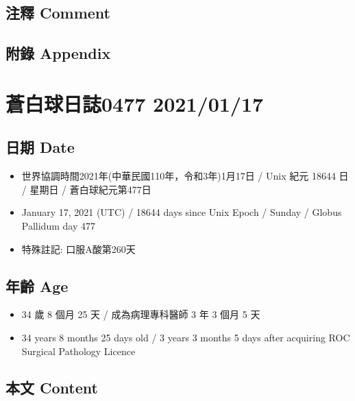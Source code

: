 \documentclass[
]{article}
\providecommand{\tightlist}{%
  \setlength{\itemsep}{0pt}\setlength{\parskip}{0pt}}
\begin{document}
\hypertarget{ux6ce8ux91cb-comment-15}{%
\subsection{注釋 Comment}\label{ux6ce8ux91cb-comment-15}}

\hypertarget{ux9644ux9304-appendix-15}{%
\subsection{附錄 Appendix}\label{ux9644ux9304-appendix-15}}

\hypertarget{ux84bcux767dux7403ux65e5ux8a8c0477-20210117}{%
\section{蒼白球日誌0477
2021/01/17}\label{ux84bcux767dux7403ux65e5ux8a8c0477-20210117}}

\hypertarget{ux65e5ux671f-date-16}{%
\subsection{日期 Date}\label{ux65e5ux671f-date-16}}

\begin{itemize}
\tightlist
\item
  世界協調時間2021年(中華民國110年，令和3年)1月17日 / Unix 紀元 18644 日
  / 星期日 / 蒼白球紀元第477日
\item
  January 17, 2021 (UTC) / 18644 days since Unix Epoch / Sunday / Globus
  Pallidum day 477
\item
  特殊註記: 口服A酸第260天
\end{itemize}

\hypertarget{ux5e74ux9f61-age-16}{%
\subsection{年齡 Age}\label{ux5e74ux9f61-age-16}}

\begin{itemize}
\tightlist
\item
  34 歲 8 個月 25 天 / 成為病理專科醫師 3 年 3 個月 5 天
\item
  34 years 8 months 25 days old / 3 years 3 months 5 days after
  acquiring ROC Surgical Pathology Licence
\end{itemize}

\hypertarget{ux672cux6587-content-16}{%
\subsection{本文 Content}\label{ux672cux6587-content-16}}
\end{document}
